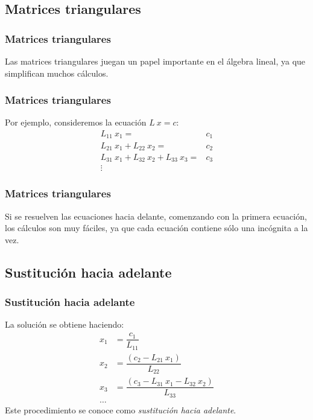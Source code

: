 \subsection*{Matrices triangulares}
\begin{frame}
\frametitle{Matrices triangulares}
Las matrices triangulares juegan un papel importante en el álgebra lineal, ya que simplifican muchos cálculos.
\end{frame}
\begin{frame}
\frametitle{Matrices triangulares}
Por ejemplo, consideremos la ecuación $L \: x = c$:
\[ \begin{split}
L_{11} \: x_{1} =& c_{1} \\
L_{21} \: x_{1} + L_{22} \: x_{2} =& c_{2} \\
L_{31} \: x_{1} + L_{32} \: x_{2} + L_{33} \: x_{3} =& c_{3} \\
\vdots
\end{split} \]
\end{frame}
\begin{frame}
\frametitle{Matrices triangulares}
Si se resuelven las ecuaciones hacia delante, comenzando con la primera ecuación, los cálculos son muy fáciles, ya que cada ecuación contiene sólo una incógnita a la vez.
\end{frame}
\subsection*{Sustitución hacia adelante}
\begin{frame}
\frametitle{Sustitución hacia adelante}
La solución se obtiene haciendo:
\[ \begin{split}
x_{1} &= \dfrac{c_{1}}{L_{11}} \\
x_{2} &= \dfrac{(c_{2} - L_{21} \: x_{1})}{L_{22}} \\
x_{3} &= \dfrac{(c_{3} - L_{31} \: x_{1} - L_{32} \: x_{2})}{L_{33}} \\
\ldots
\end{split} \]
Este procedimiento se conoce como \emph{sustitución hacia adelante}.
\end{frame}
